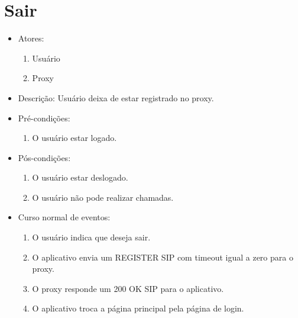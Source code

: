 \documentclass[12pt,a4paper]{article}
\begin{document}
\section{Sair}
\begin{itemize}
	\item Atores:
	\begin{enumerate}
		\item Usu\'{a}rio
		\item Proxy
	\end{enumerate}
	\item Descri\c{c}\~{a}o: Usu\'{a}rio deixa de estar registrado no proxy.
	\item Pr\'{e}-condi\c{c}\~{o}es:
	\begin{enumerate}
		\item O usu\'{a}rio estar logado.
	\end{enumerate}
	\item P\'{o}s-condi\c{c}\~{o}es:
	\begin{enumerate}
        \item O usu\'{a}rio estar deslogado.
        \item O usu\'{a}rio n\~{a}o pode realizar chamadas.
	\end{enumerate}
	\item Curso normal de eventos:
	\begin{enumerate}
	    \item O usu\'{a}rio indica que deseja sair.
        \item O aplicativo envia um REGISTER SIP com timeout igual a zero para o proxy.
        \item O proxy responde um 200 OK SIP para o aplicativo.
        \item O aplicativo troca a p\'{a}gina principal pela p\'{a}gina de login.
	\end{enumerate}	
\end{itemize}
\end{document}
